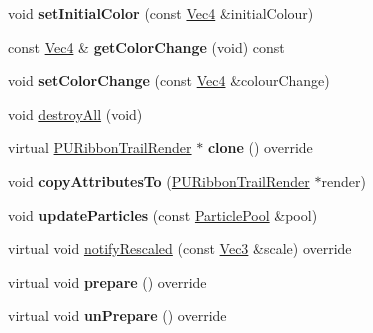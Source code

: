 \begin{DoxyCompactItemize}
\mbox{\label{classPURibbonTrailRender_a8d85187195bf24bf5a46efad2b8f0a0a}} 
void {\bfseries set\+Initial\+Color} (const \hyperlink{classVec4}{Vec4} \&initial\+Colour)
\item 
\mbox{\label{classPURibbonTrailRender_a8c151506aceef4c5a6029e7da47a585f}} 
const \hyperlink{classVec4}{Vec4} \& {\bfseries get\+Color\+Change} (void) const
\item 
\mbox{\label{classPURibbonTrailRender_a205e2b12e49c1c0a950065ac45d54ff8}} 
void {\bfseries set\+Color\+Change} (const \hyperlink{classVec4}{Vec4} \&colour\+Change)
\item 
void \hyperlink{classPURibbonTrailRender_a98f209e22dc55676e0b01c609e2b5262}{destroy\+All} (void)
\item 
\mbox{\label{classPURibbonTrailRender_a9542d1efc1fef8cc08caeec65e69ceb3}} 
virtual \hyperlink{classPURibbonTrailRender}{P\+U\+Ribbon\+Trail\+Render} $\ast$ {\bfseries clone} () override
\item 
\mbox{\label{classPURibbonTrailRender_a0d6006a6db08f35129eec25fefe9e0b0}} 
void {\bfseries copy\+Attributes\+To} (\hyperlink{classPURibbonTrailRender}{P\+U\+Ribbon\+Trail\+Render} $\ast$render)
\item 
\mbox{\label{classPURibbonTrailRender_a0e4a6bc5ce65e6613942b96b3fadb39d}} 
void {\bfseries update\+Particles} (const \hyperlink{classDataPool}{Particle\+Pool} \&pool)
\item 
virtual void \hyperlink{classPURibbonTrailRender_aeb5cf442af12f6f2593f1b9020281577}{notify\+Rescaled} (const \hyperlink{classVec3}{Vec3} \&scale) override
\item 
\mbox{\label{classPURibbonTrailRender_a634de88bd530db7e0910b9a5c792e512}} 
virtual void {\bfseries prepare} () override
\item 
\mbox{\label{classPURibbonTrailRender_aa5fb1cc40698018c8b363357c4152710}} 
virtual void {\bfseries un\+Prepare} () override
\item 
\mbox{\label{classPURibbonTrailRender_af07a34edcf852eade3f459639c696ff3}} 

\end{DoxyCompactItemize}
